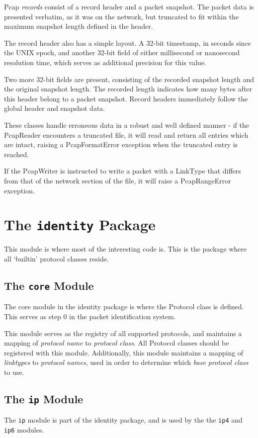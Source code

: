 \documentclass[10pt,a4paper,notitlepage,twoside]{report}
\begin{document}
Pcap \emph{records} consist of a record header and a packet snapshot. The packet data is presented verbatim, as it was on the network, but truncated to fit within the maximum snapshot length defined in the header.

The record header also has a simple layout. A 32-bit timestamp, in seconds since the UNIX epoch, and another 32-bit field of either millisecond or nanosecond resolution time, which serves as additional precision for this value.

Two more 32-bit fields are present, consisting of the recorded snapshot length and the original snapshot length. The recorded length indicates how many bytes after this header belong to a packet snapshot. Record headers immediately follow the global header and snapshot data.

These classes handle erroneous data in a robust and well defined manner - if the PcapReader encounters a truncated file, it will read and return all entries which are intact, raising a PcapFormatError exception when the truncated entry is reached.
 
If the PcapWriter is instructed to write a packet with a LinkType that differs from that of the network section of the file, it will raise a PcapRangeError exception.

\section{The \texttt{identity} Package}
This module is where most of the interesting code is. This is the package where all `builtin' protocol classes reside.

\subsection{The \texttt{core} Module}
The core module in the identity package is where the Protocol class is defined. This serves as step 0 in the packet identification system.

This module serves as the registry of all supported protocols, and maintains a mapping of \emph{protocol name} to \emph{protocol class}. All Protocol classes should be registered with this module. Additionally, this module maintains a mapping of \emph{linktypes} to \emph{protocol names}, used in order to determine  which \emph{base protocol class} to use.
 
\subsection{The \texttt{ip} Module}
The \texttt{ip} module is part of the identity package, and is used by the the \texttt{ip4} and \texttt{ip6} modules.
\end{document}
